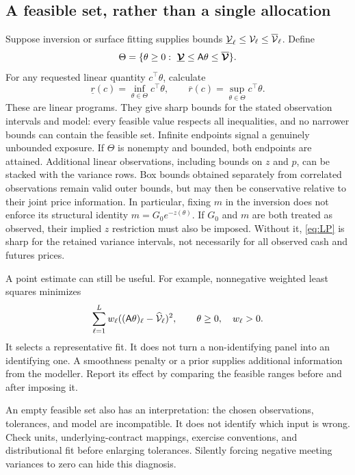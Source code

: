 \subsection{A feasible set, rather than a single allocation}
Suppose inversion or surface fitting supplies bounds $\underline{\mathcal V}_\ell\leq \mathcal V_\ell\leq\overline{\mathcal V}_\ell$. Define
\begin{equation}\label{eq:feasible}
\Theta=\{\theta\geq0:\ \underline{\boldsymbol{\mathcal V}}\leq\mathsf A\theta
                                    \leq\overline{\boldsymbol{\mathcal V}}\}.
\end{equation}
For any requested linear quantity $c^\top\theta$, calculate
\begin{equation}\label{eq:LP}
\underline r(c)=\inf_{\theta\in\Theta}c^\top\theta,\qquad
\overline r(c)=\sup_{\theta\in\Theta}c^\top\theta.
\end{equation}
These are linear programs. They give sharp bounds for the stated observation intervals and model: every feasible value respects all inequalities, and no narrower bounds can contain the feasible set. Infinite endpoints signal a genuinely unbounded exposure. If $\Theta$ is nonempty and bounded, both endpoints are attained. Additional linear observations, including bounds on $z$ and $p$, can be stacked with the variance rows. Box bounds obtained separately from correlated observations remain valid outer bounds, but may then be conservative relative to their joint price information. In particular, fixing $m$ in the inversion does not enforce its structural identity $m=G_0e^{-z(\theta)}$. If $G_0$ and $m$ are both treated as observed, their implied $z$ restriction must also be imposed. Without it, \eqref{eq:LP} is sharp for the retained variance intervals, not necessarily for all observed cash and futures prices.

A point estimate can still be useful. For example, nonnegative weighted least squares minimizes
\begin{equation}\label{eq:fit}
\sum_{\ell=1}^L w_\ell((\mathsf A\theta)_\ell-\widehat{\mathcal V}_\ell)^2,
\qquad \theta\geq0,\quad w_\ell>0.
\end{equation}
It selects a representative fit. It does not turn a non-identifying panel into an identifying one. A smoothness penalty or a prior supplies additional information from the modeller. Report its effect by comparing the feasible ranges before and after imposing it.

An empty feasible set also has an interpretation: the chosen observations, tolerances, and model are incompatible. It does not identify which input is wrong. Check units, underlying-contract mappings, exercise conventions, and distributional fit before enlarging tolerances. Silently forcing negative meeting variances to zero can hide this diagnosis.

